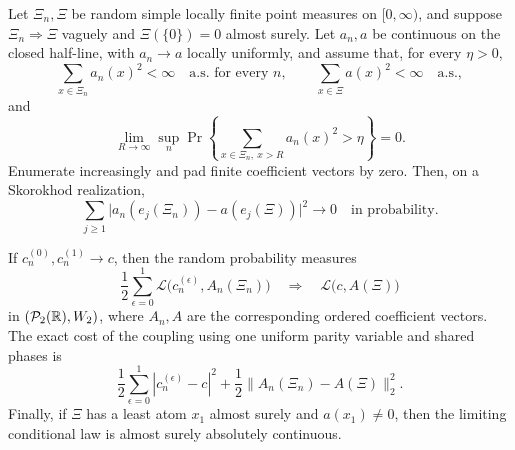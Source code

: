 \begin{proposition}
\label{prop:marked-stability}
Let \(\Xi_n,\Xi\) be random simple locally finite point measures on
\([0,\infty)\), and suppose \(\Xi_n\Rightarrow\Xi\) vaguely and
\(\Xi(\{0\})=0\) almost surely.  Let \(a_n,a\) be continuous on the closed
half-line, with \(a_n\to a\) locally uniformly, and assume that, for every
\(\eta>0\),
\[
 \sum_{x\in\Xi_n}a_n(x)^2<\infty\quad\text{a.s. for every }n,
 \qquad
 \sum_{x\in\Xi}a(x)^2<\infty\quad\text{a.s.},
\]
and
\begin{equation}
 \lim_{R\to\infty}\sup_n
 \Pr\left\{\sum_{x\in\Xi_n,\ x>R}a_n(x)^2>\eta\right\}=0.
 \label{eq:abstract-tail-hypothesis}
\end{equation}
Enumerate increasingly and pad finite coefficient vectors by zero.  Then,
on a Skorokhod realization,
\begin{equation}
 \sum_{j\ge1}
 \bigl|a_n(e_j(\Xi_n))-a(e_j(\Xi))\bigr|^2
 \longrightarrow0
 \quad\text{in probability}.
 \label{eq:closed-edge-l2-matching}
\end{equation}

If \(c_n^{(0)},c_n^{(1)}\to c\), then the random probability measures
\[
 \frac12\sum_{\epsilon=0}^1
 \mathcal L\bigl(c_n^{(\epsilon)},A_n(\Xi_n)\bigr)
 \quad\Longrightarrow\quad
 \mathcal L\bigl(c,A(\Xi)\bigr)
\]
in \((\mathcal P_2(\mathbb R),W_2)\), where \(A_n,A\) are the corresponding ordered
coefficient vectors.  The exact cost of the coupling using one uniform
parity variable and shared phases is
\begin{equation}
 \frac12\sum_{\epsilon=0}^1|c_n^{(\epsilon)}-c|^2
 +\frac12\|A_n(\Xi_n)-A(\Xi)\|_2^2.
 \label{eq:parity-shared-coupling-cost}
\end{equation}
Finally, if \(\Xi\) has a least atom \(x_1\) almost surely and
\(a(x_1)\ne0\), then the limiting conditional law is almost surely
absolutely continuous.
\end{proposition}

